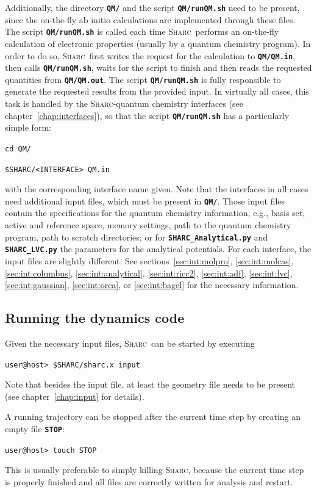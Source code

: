 \documentclass[a4paper,10pt,DIV=15,openany]{scrbook}
\newcommand{\sharc}{\textsc{Sharc}}
\newcommand{\ttt}[1]{\textbf{\texttt{#1}}}
\newenvironment{example}{
  \setlength{\OuterFrameSep}{3pt}
  \vspace{0mm}
  \definecolor{shadecolor}{HTML}{E4F4FF}
  \begin{shaded}
}{
  \end{shaded}
}
\begin{document}
Additionally, the directory \ttt{QM/} and the script \ttt{QM/runQM.sh} need to be present, since the on-the-fly ab initio calculations are implemented through these files. The script \ttt{QM/runQM.sh} is called each time \sharc\ performs an on-the-fly calculation of electronic properties (usually by a quantum chemistry program). In order to do so, \sharc\ first writes the request for the calculation to \ttt{QM/QM.in}, then calls \ttt{QM/runQM.sh}, waits for the script to finish and then reads the requested quantities from \ttt{QM/QM.out}. The script \ttt{QM/runQM.sh} is fully responsible to generate the requested results from the provided input. 
In virtually all cases, this task is handled by the \sharc-quantum chemistry interfaces (see chapter~\ref{chap:interfaces}), so that the script \ttt{QM/runQM.sh} has a particularly simple form:
\begin{example}
\verb|cd QM/|

\verb|$SHARC/<INTERFACE> QM.in |
\end{example}
with the corresponding interface name given. Note that the interfaces in all cases need additional input files, which must be present in \ttt{QM/}. Those input files contain the specifications for the quantum chemistry information, e.g., basis set, active and reference space, memory settings, path to the quantum chemistry program, path to scratch directories; or for \ttt{SHARC\_Analytical.py} and \ttt{SHARC\_LVC.py} the parameters for the analytical potentials. For each interface, the input files are slightly different. See sections~\ref{sec:int:molpro}, \ref{sec:int:molcas}, \ref{sec:int:columbus}, \ref{sec:int:analytical}, \ref{sec:int:ricc2}, \ref{sec:int:adf}, \ref{sec:int:lvc}, \ref{sec:int:gaussian}, \ref{sec:int:orca}, or \ref{sec:int:bagel} for the necessary information.

\subsection{Running the dynamics code}

Given the necessary input files, \sharc\ can be started by executing
\begin{example}
\verb|user@host> $SHARC/sharc.x input|
\end{example}
Note that besides the input file, at least the geometry file needs to be present (see chapter~\ref{chap:input} for details).

A running trajectory can be stopped after the current time step by creating an empty file \ttt{STOP}:
\begin{example}
\verb|user@host> touch STOP|
\end{example}
This is usually preferable to simply killing \sharc, because the current time step is properly finished and all files are correctly written for analysis and restart.
\end{document}
